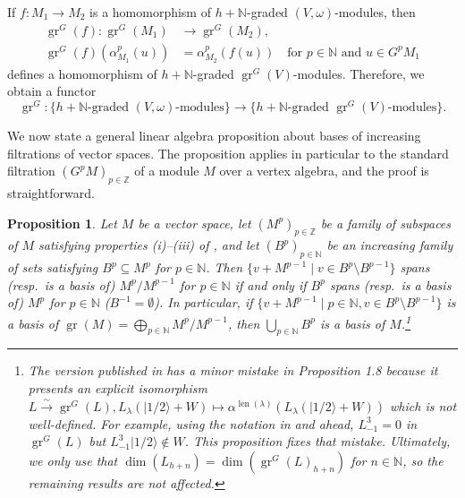 \documentclass[a4paper, 12pt, reqno]{amsart}
\newtheorem{proposition}[theorem]{Proposition}
\theoremstyle{remark}
\DeclareMathOperator{\gr}{gr}
\DeclareMathOperator{\len}{len}
\newcommand{\vachalf}{{|1/2\rangle}}
\begin{document}
If $f: M_1 \to M_2$ is a homomorphism of $h + \mathbb{N}$-graded $(V, \omega)$-modules, then
\begin{align*}
  \gr^G(f): \gr^G(M_1) &\to \gr^G(M_2), \\
  \gr^G(f)(\alpha^p_{M_1}(u)) &= \alpha^p_{M_2}(f(u)) \quad \text{for $p \in \mathbb{N}$ and $u \in G^pM_1$}
\end{align*}
defines a homomorphism of $h + \mathbb{N}$-graded $\gr^G(V)$-modules.
Therefore, we obtain a functor
\begin{equation*}
  \gr^G: \{\text{$h + \mathbb{N}$-graded $(V, \omega)$-modules}\} \to \{\text{$h + \mathbb{N}$-graded $\gr^G(V)$-modules}\}.
\end{equation*}

We now state a general linear algebra proposition about bases of increasing filtrations of vector spaces.
The proposition applies in particular to the standard filtration $(G^pM)_{p \in \mathbb{Z}}$ of a module $M$ over a vertex algebra, and the proof is straightforward.

\begin{proposition}
  \label{prp:3}
  Let $M$ be a vector space, let $(M^p)_{p \in \mathbb{Z}}$ be a family of subspaces of $M$ satisfying properties \emph{(i)--(iii)} of , and let $(B^p)_{p \in \mathbb{N}}$ be an increasing family of sets satisfying $B^p \subseteq M^p$ for $p \in \mathbb{N}$.
  Then $\{v + M^{p - 1} \mid v \in B^p \setminus B^{p - 1}\}$ spans (resp.\ is a basis of) $M^p/M^{p - 1}$ for $p \in \mathbb{N}$ if and only if $B^p$ spans (resp.\ is a basis of) $M^p$ for $p \in \mathbb{N}$ ($B^{-1} = \emptyset$).
  In particular, if $\{v + M^{p - 1} \mid p \in \mathbb{N}, v \in B^p \setminus B^{p - 1}\}$ is a basis of $\gr(M) = \bigoplus_{p \in \mathbb{N}}M^p/M^{p - 1}$, then $\bigcup_{p \in \mathbb{N}}B^p$ is a basis of $M$.\footnote{The version published in \cite{salazar_pbw_2024} has a minor mistake in Proposition 1.8 because it presents an explicit isomorphism $L \xrightarrow{\sim} \gr^G(L), L_{\lambda}(\vachalf + W) \mapsto \alpha^{\len(\lambda)}(L_{\lambda}(\vachalf + W))$ which is not well-defined.
    For example, using the notation in  and  ahead, $L_{-1}^3 = 0$ in $\gr^G(L)$ but $L_{-1}^3\vachalf \notin W$.
    This proposition fixes that mistake.
    Ultimately, we only use that $\dim(L_{h + n}) = \dim(\gr^G(L)_{h + n})$ for $n \in \mathbb{N}$, so the remaining results are not affected.}
\end{proposition}
\end{document}
